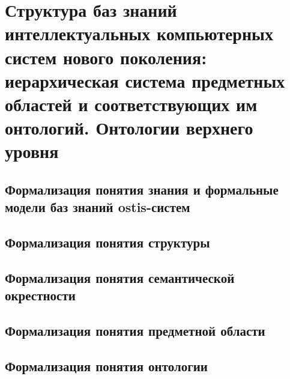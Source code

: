 \chapter{Структура баз знаний интеллектуальных компьютерных систем нового поколения: иерархическая система предметных областей и соответствующих им онтологий. Онтологии верхнего уровня}
\label{chapter_kb}


\section{Формализация понятия знания и формальные модели баз знаний ostis-систем}
\section{Формализация понятия структуры}
\section{Формализация понятия семантической окрестности}
\section{Формализация понятия предметной области}
\section{Формализация понятия онтологии}

%